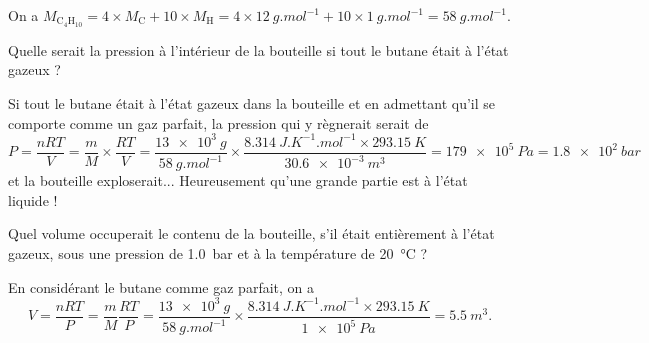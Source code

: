 
\begin{corrige}
On a $M_{\mathrm{C_4H_{10}}} = 4\times M_\mathrm{C} + 10 \times M_\mathrm{H} = 4\times \SI{12}{g.mol^{-1}}+ 10 \times \SI{1}{g.mol^{-1}} = \SI{58}{g.mol^{-1}}$.
\end{corrige}



\begin{enonce}
Quelle serait la pression à l'intérieur de la bouteille si tout le butane était à l'état gazeux ?\\\mbox{}
\end{enonce}


\begin{corrige}
Si tout le butane était à l'état gazeux dans la bouteille et en admettant qu'il se comporte comme un gaz parfait, la pression qui y règnerait serait de 
$$
P=\frac{nRT}{V}=\frac{m}{M}\times \frac{RT}{V}=\frac{\SI{13e3}{g}}{\SI{58}{g.mol^{-1}}}\times \frac{\SI{8,314}{J.K^{-1}.mol^{-1}}\times \SI{293.15}{K}}{\SI{30.6e-3}{m^3}}
=\SI{179e5}{Pa}=\SI{1.8e2}{bar}
$$ 
et la bouteille exploserait... Heureusement qu'une grande partie est à l'état liquide !
\end{corrige}



\begin{enonce}
Quel volume occuperait le contenu de la bouteille, s'il était entièrement à l'état gazeux, sous une pression de \SI{1.0}{bar} et à la température de \SI{20}{\celsius} ?
\end{enonce}


\begin{corrige}
En considérant le butane comme gaz parfait, on a 
\[
V=\frac{nRT}{P}=\frac{m}{M}\frac{RT}{P}=
\frac{\SI{13e3}{g}}{\SI{58}{g.mol^{-1}}}
\times \frac{\SI{8,314}{J.K^{-1}.mol^{-1}} \times \SI{293.15}{K}}{\SI{1e5}{Pa}}=\SI{5,5}{m^3}.
\]
\end{corrige}

